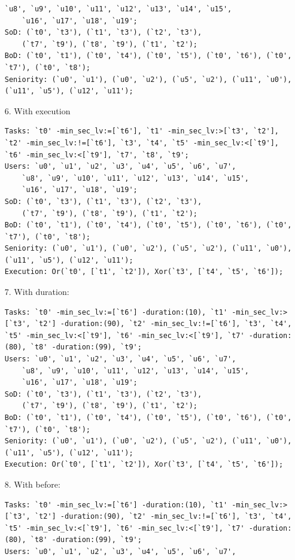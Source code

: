 \documentclass[a4paper]{report}
\begin{document}
\begin{enumerate}
\begin{lstlisting}[frame=single]
	`u8', `u9', `u10', `u11', `u12', `u13', `u14', `u15', 
	`u16', `u17', `u18', `u19'; 
SoD: (`t0', `t3'), (`t1', `t3'), (`t2', `t3'), 
	(`t7', `t9'), (`t8', `t9'), (`t1', `t2');
BoD: (`t0', `t1'), (`t0', `t4'), (`t0', `t5'), (`t0', `t6'), (`t0', `t7'), (`t0', `t8');
Seniority: (`u0', `u1'), (`u0', `u2'), (`u5', `u2'), (`u11', `u0'), (`u11', `u5'), (`u12', `u11'); 
\end{lstlisting}
\item[6.] With execution
\begin{lstlisting}[frame=single]
Tasks: `t0' -min_sec_lv:=[`t6'], `t1' -min_sec_lv:>[`t3', `t2'], `t2' -min_sec_lv:!=[`t6'], `t3', `t4', `t5' -min_sec_lv:<[`t9'], `t6' -min_sec_lv:<[`t9'], `t7', `t8', `t9';
Users: `u0', `u1', `u2', `u3', `u4', `u5', `u6', `u7', 
	`u8', `u9', `u10', `u11', `u12', `u13', `u14', `u15', 
	`u16', `u17', `u18', `u19'; 
SoD: (`t0', `t3'), (`t1', `t3'), (`t2', `t3'), 
	(`t7', `t9'), (`t8', `t9'), (`t1', `t2');
BoD: (`t0', `t1'), (`t0', `t4'), (`t0', `t5'), (`t0', `t6'), (`t0', `t7'), (`t0', `t8');
Seniority: (`u0', `u1'), (`u0', `u2'), (`u5', `u2'), (`u11', `u0'), (`u11', `u5'), (`u12', `u11');
Execution: Or(`t0', [`t1', `t2']), Xor(`t3', [`t4', `t5', `t6']); 
\end{lstlisting} 
\item[7.] With duration:
\begin{lstlisting}[frame=single]
Tasks: `t0' -min_sec_lv:=[`t6'] -duration:(10), `t1' -min_sec_lv:>[`t3', `t2'] -duration:(90), `t2' -min_sec_lv:!=[`t6'], `t3', `t4', `t5' -min_sec_lv:<[`t9'], `t6' -min_sec_lv:<[`t9'], `t7' -duration:(80), `t8' -duration:(99), `t9';
Users: `u0', `u1', `u2', `u3', `u4', `u5', `u6', `u7', 
	`u8', `u9', `u10', `u11', `u12', `u13', `u14', `u15', 
	`u16', `u17', `u18', `u19'; 
SoD: (`t0', `t3'), (`t1', `t3'), (`t2', `t3'), 
	(`t7', `t9'), (`t8', `t9'), (`t1', `t2');
BoD: (`t0', `t1'), (`t0', `t4'), (`t0', `t5'), (`t0', `t6'), (`t0', `t7'), (`t0', `t8');
Seniority: (`u0', `u1'), (`u0', `u2'), (`u5', `u2'), (`u11', `u0'), (`u11', `u5'), (`u12', `u11');
Execution: Or(`t0', [`t1', `t2']), Xor(`t3', [`t4', `t5', `t6']); 
\end{lstlisting}
\item[8.] With before:
\begin{lstlisting}[frame=single]
Tasks: `t0' -min_sec_lv:=[`t6'] -duration:(10), `t1' -min_sec_lv:>[`t3', `t2'] -duration:(90), `t2' -min_sec_lv:!=[`t6'], `t3', `t4', `t5' -min_sec_lv:<[`t9'], `t6' -min_sec_lv:<[`t9'], `t7' -duration:(80), `t8' -duration:(99), `t9';
Users: `u0', `u1', `u2', `u3', `u4', `u5', `u6', `u7', 

\end{lstlisting}
\end{enumerate}
\end{document}
